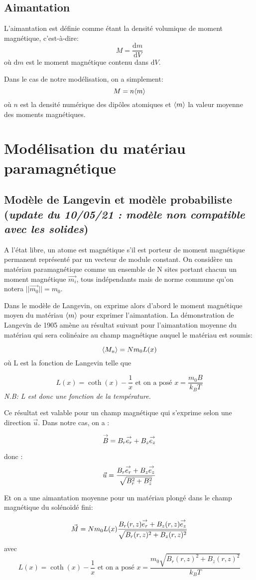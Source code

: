 \documentclass{article}
\begin{document}
\subsection{Aimantation}
L'aimantation est définie comme étant la densité volumique de moment magnétique, c'est-à-dire: $$M = \frac{\mathrm{d}m}{\mathrm{d}V}$$
où $\mathrm{d}m$ est le moment magnétique contenu dans $\mathrm{d}V$.

Dans le cas de notre modélisation, on a simplement:
$$M = n \valmoy{m}$$ où $n$ est la densité numérique des dipôles atomiques et $\valmoy{m}$ la valeur moyenne des moments magnétiques.

\section{Modélisation du matériau paramagnétique}
\subsection{Modèle de Langevin et modèle probabiliste (\emph{update du 10/05/21 : modèle non compatible avec les solides})}

A l’état libre, un atome est magnétique s’il est porteur de moment magnétique permanent représenté par un vecteur de module constant.
On considère un matériau paramagnétique comme un ensemble de N sites portant chacun un moment magnétique $\vec{m_i}$, tous indépendants mais de norme commune qu'on notera $||\vec{m_0} || = m_0$.

Dans le modèle de Langevin, on exprime alors d'abord le moment magnétique moyen du matériau $\valmoy{m}$ pour exprimer l'aimantation. La démonstration de Langevin de 1905 amène au résultat suivant pour l'aimantation moyenne du matériau qui sera colinéaire au champ magnétique auquel le matériau est soumis:

$$\valmoy{M_u} = Nm_0L(x)$$
où L est la fonction de Langevin telle que

$$L(x) = \coth(x) - \frac{1}{x} \mbox{ et on a posé } x = \frac{m_0 B}{k_B T}$$
\emph{N.B: L est donc une fonction de la température.}

Ce résultat est valable pour un champ magnétique qui s'exprime selon une direction $\vec{u}$. Dans notre cas, on a :

$$\overset{\to}{B} = B_r \overset{\to}{e_r} + B_z \overset{\to}{e_z} $$

donc : 
$$\vec{u} = \frac{B_r \overset{\to}{e_r} + B_z \overset{\to}{e_z}}{\sqrt{B_r^2 + B_z^2}}$$

Et on a une aimantation moyenne pour un matériau plongé dans le champ magnétique du solénoïdé fini:
\begin{prettybox}[blue]
    $$\vec{M} = Nm_0L(x) \frac{B_r(r,z) \overset{\to}{e_r} + B_z(r,z) \overset{\to}{e_z}}{\sqrt{B_r(r,z)^2 + B_z(r,z)^2}} $$
avec $$L(x) = \coth(x) - \frac{1}{x} \mbox{ et on a posé } x = \frac{m_0 \sqrt{B_r(r,z)^2 + B_z(r,z)^2}}{k_B T}$$
\end{prettybox}
\end{document}
